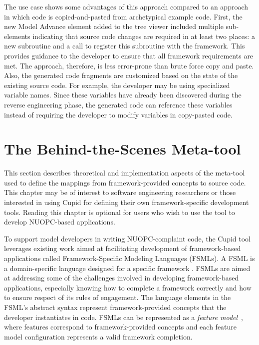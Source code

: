 \documentclass[oneside,11pt]{memoir}
\begin{document}
The use case shows some advantages of this approach compared to an approach in which code is copied-and-pasted from archetypical example code. First, the new Model Advance element added to the tree viewer included multiple sub-elements indicating that source code changes are required in at least two places: a new subroutine and a call to register this subroutine with the framework.  This provides guidance to the developer to ensure that all framework requirements are met. The approach, therefore, is less error-prone than brute force copy and paste. Also, the generated code fragments are customized based on the state of the existing source code. For example, the developer may be using specialized variable names. Since these variables have already been discovered during the reverse engineering phase, the generated code can reference these variables instead of requiring the developer to modify variables in copy-pasted code.




\chapter{The Behind-the-Scenes Meta-tool}

This section describes theoretical and implementation aspects of the meta-tool used to define the mappings from framework-provided concepts to source code. This chapter may be of interest to software engineering researchers or those interested in using Cupid for defining their own framework-specific development tools. Reading this chapter is optional for users who wish to use the tool to develop NUOPC-based applications.

To support model developers in writing NUOPC-complaint code, the Cupid tool leverages existing work aimed at facilitating development of framework-based applications called Framework-Specific Modeling Languages (FSMLs). A FSML is a domain-specific language designed for a specific framework \cite{antkiewicz06}. FSMLs are aimed at addressing some of the challenges involved in developing framework-based applications, especially knowing how to complete a framework correctly and how to ensure respect of its rules of engagement\cite{antkiewicz06}. The language elements in the FSML's abstract syntax represent framework-provided concepts that the developer instantiates in code. FSMLs can be represented as a \emph{feature model}~\cite{czarnecki}, where features correspond to framework-provided concepts and each feature model configuration represents a valid framework completion.
\end{document}
